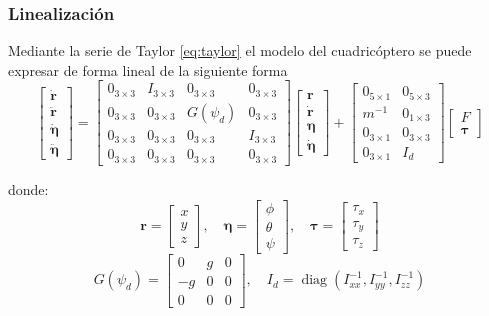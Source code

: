 \subsubsection{Linealización}
Mediante la serie de Taylor \eqref{eq:taylor} el modelo del cuadricóptero se puede expresar de forma lineal de la siguiente forma
\begin{equation}
	\label{eq:modelo_lineal}
\begin{bmatrix}
\dot{\mathbf{r}} \\ \ddot{\mathbf{r}} \\ \dot{\boldsymbol{\eta}} \\ \ddot{\boldsymbol{\eta}}
\end{bmatrix}
=
\begin{bmatrix}
\mathit{0}_{3\times3} & I_{3\times3} & \mathit{0}_{3\times3} & \mathit{0}_{3\times3} \\
\mathit{0}_{3\times3} & \mathit{0}_{3\times3} & G(\psi_d) & \mathit{0}_{3\times3} \\
\mathit{0}_{3\times3} & \mathit{0}_{3\times3} & \mathit{0}_{3\times3} & I_{3\times3} \\
\mathit{0}_{3\times3} & \mathit{0}_{3\times3} & \mathit{0}_{3\times3} & \mathit{0}_{3\times3}
\end{bmatrix}
\begin{bmatrix}
\mathbf{r} \\ \dot{\mathbf{r}} \\ \boldsymbol{\eta} \\ \dot{\boldsymbol{\eta}}
\end{bmatrix}
+
\begin{bmatrix}
\mathit{0}_{5\times1} & \mathit{0}_{5\times3} \\
m^{-1} & \mathit{0}_{1\times3}\\
\mathit{0}_{3\times1} & \mathit{0}_{3\times3} \\
\mathit{0}_{3\times1} & I_d
\end{bmatrix}
\begin{bmatrix}
F \\ \boldsymbol{\tau}
\end{bmatrix}
\end{equation}

donde:
\[
\mathbf{r} = \begin{bmatrix}x \\ y \\ z\end{bmatrix}, \quad
\boldsymbol{\eta } = \begin{bmatrix}\phi \\ \theta \\ \psi\end{bmatrix}, \quad
\boldsymbol{\tau} = \begin{bmatrix}\tau_x \\ \tau_y \\ \tau_z\end{bmatrix}
\]
\[
\mathit{G}(\psi_d) = \begin{bmatrix}
0 & g & 0\\
-g & 0 & 0\\
0 & 0 & 0
\end{bmatrix}, \quad
I_d = \operatorname{diag}\left(I_{xx}^{-1}, I_{yy}^{-1}, I_{zz}^{-1}\right)
\]
